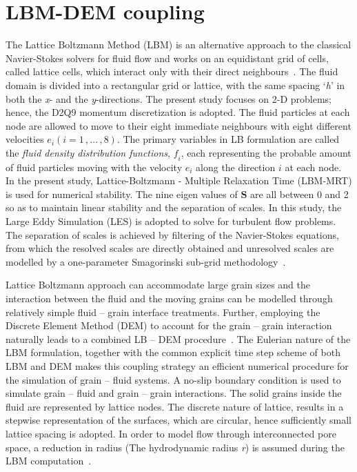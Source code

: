 \documentclass[epj,twocolumn]{webofc}
\begin{document}
\section{LBM-DEM coupling}
The Lattice Boltzmann Method (LBM) is an alternative approach to
the classical Navier-Stokes solvers for fluid flow and works on an
equidistant grid of cells, called lattice cells, which interact only with
their direct neighbours~\cite{He1997}. The fluid domain is divided into
a rectangular grid or lattice, with the same spacing `\textit{h}’ in both the \textit{x}-
and the \textit{y}-directions. The present study focuses on 2-D problems; hence,
the D2Q9 momentum discretization is adopted. The fluid particles at
each node are allowed to move to their eight immediate neighbours
with eight different velocities $\mathit{e_i} (\mathit{i}=1\,,\dots\,,8)$.
The primary variables in LB formulation are called the \textit{fluid 
density distribution functions}, $\mathit{f_i}$, each representing the probable 
amount of fluid particles moving with the velocity $\mathit{e_i}$ along the 
direction $\mathit{i}$ at each node. In the present study, Lattice-Boltzmann
- Multiple Relaxation Time (LBM-MRT) is used for numerical stability.
The nine eigen values of $\mathbf{S}$ are all between 0 and 2 so as to
maintain linear stability and the separation of scales. In  this  study,
the Large Eddy Simulation (LES) is adopted to solve for turbulent flow
problems. The separation of scales is achieved by filtering of the
Navier-Stokes equations, from which the resolved scales are directly
obtained and unresolved scales are modelled by a one-parameter
Smagorinski sub-grid methodology~\cite{Smagorinsky1963}. 

Lattice Boltzmann approach can accommodate large grain sizes and the
interaction between the fluid and the moving grains can be modelled
through relatively simple fluid – grain interface treatments. Further,
employing the Discrete Element Method (DEM) to account for the
grain – grain interaction naturally leads to a combined LB – DEM
procedure~\cite{Kumar2012}. The Eulerian nature of the LBM formulation,
together with the common explicit time step scheme of both LBM and DEM
makes this coupling strategy an efficient numerical procedure for the
simulation of grain – fluid systems. A no-slip boundary condition is
used to simulate grain – fluid and grain – grain interactions. The
solid grains inside the fluid are represented by lattice
nodes. The discrete nature of lattice, results in a stepwise
representation of the surfaces, which are circular, hence
sufficiently small lattice spacing is adopted. In order to model flow
through interconnected pore space, a reduction in radius (The
hydrodynamic radius \textit{r}) is assumed during the
LBM computation~\citep{soundararajan2015}.
\end{document}
